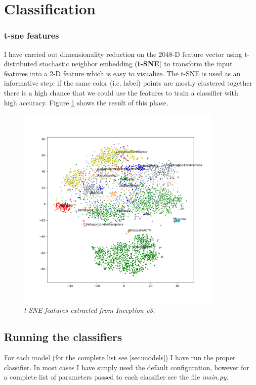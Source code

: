 \documentclass[12pt]{article}
\begin{document}
\section{Classification}
\subsubsection{t-sne features}
I have carried out dimensionality reduction on the 2048-D feature vector using t-distributed stochastic neighbor embedding (\textbf{t-SNE}) to transform the input features into a 2-D feature which is easy to visualize. The t-SNE is used as an informative step: if the same color (i.e. label) points are mostly clustered together there is a high chance that we could use the features to train a classifier with high accuracy. Figure \ref{fig:tsne} shows the result of this phase.

\begin{figure}[!hb]
	\centering %
	\includegraphics[width=0.9\textwidth]{../code/output/features.png} %
	\caption{\textit{t-SNE features extracted from Inception v3.}} %
	\label{fig:tsne}
\end{figure}

\subsection{Running the classifiers}
For each model (for the complete list see \ref{sec:models}) I have run the proper classifier. In most cases I have simply used the default configuration, however for a complete list of parameters passed to each classifier see the file \textit{main.py}.
\end{document}
